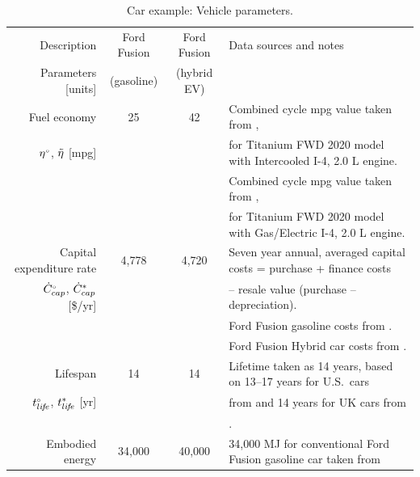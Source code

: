 \documentclass[12pt]{article}\usepackage[]{graphicx}\usepackage[]{xcolor}
\begin{document}
\begin{landscape}
\begin{table}
\footnotesize
\begin{center}
\caption{Car example: Vehicle parameters.} 
\label{tab:car_parameters}
\begin{tabular}{ r c c l }
  \toprule
    Description                  & Ford Fusion & Ford Fusion & Data sources and notes\\ 
    Parameters [units]                              & (gasoline) & (hybrid EV) &  \\
  \midrule
  Fuel economy                           & 25 & 42 & Combined cycle mpg value taken from \citet{Car_Connection:2020}, \\
  ${}{\eta}^{\scriptscriptstyle \circ}$, $\tilde{\eta}$ [mpg]             &           &          & for Titanium FWD 2020 model with Intercooled I-4, 2.0 L engine.   \\
                                                    &           &          & Combined cycle mpg value taken from \citet{Car_Connection:2020},\\
                                                    &           &          & for Titanium FWD 2020 model with Gas/Electric I-4, 2.0 L engine. \\
  \midrule
   Capital expenditure rate      & 4,778     & 4,720    & Seven year annual, averaged capital costs = purchase + finance costs  \\
   ${}{\dot{C}}^{\scriptscriptstyle \circ}_{cap}$, ${\dot{C}}^*_{cap}$ [\$/yr] &           &          & -- resale value (purchase -- depreciation).  \\
                                                    &           &          & Ford Fusion gasoline costs from \citet{Edmunds:2020_fusion_gasoline}. \\
                                                    &           &          & Ford Fusion Hybrid car costs from \citet{Edmunds:2020_fusion_hybrid}. \\
 \midrule
   Lifespan                     & 14  & 14 & Lifetime taken as 14 years, based on 13--17 years for U.S.\ cars \\
   ${}{t}^{\scriptscriptstyle \circ}_{li\!f\!e}$, ${t}^*_{li\!f\!e}$ [yr]    &           &          & from \citet{Berla:2016} and 14 years for UK cars from \\
                                                    &           &          & \citet{SMMT:2020}. \\
 \midrule
   Embodied energy             & 34,000    & 40,000   & 34,000 MJ for conventional Ford Fusion gasoline car taken from \\

\end{tabular}
\end{center}
\end{table}
\end{landscape}
\end{document}
